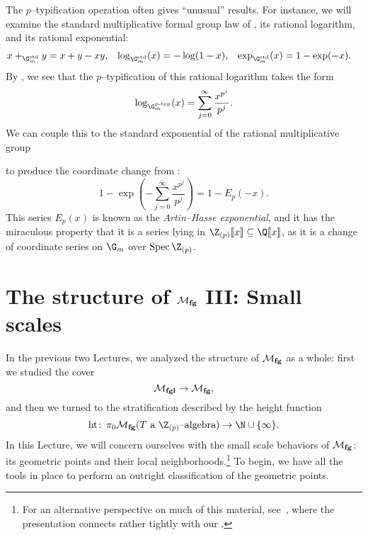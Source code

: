 \begin{remark}\label{ArtinHasseExponential}
The $p$--typification operation often gives ``unusual'' results.  For instance, we will examine the standard multiplicative formal group law of , its rational logarithm, and its rational exponential:
\begin{align*}
x +_{\G_m^{\mathrm{std}}} y & = x + y - xy, &
\log_{\G_m^{\mathrm{std}}}(x) & = -\log(1 - x), &
\exp_{\G_m^{\mathrm{std}}}(x) & = 1 - \exp(-x).
\end{align*}
By , we see that the $p$--typification of this rational logarithm takes the form \[\log_{\G_m^{\ptyp}}(x) = \sum_{j=0}^\infty \frac{x^{p^j}}{p^j}.\]  We can couple this to the standard exponential of the rational multiplicative group
\begin{center}
\end{center}
to produce the coordinate change from : \[1 - \exp \left( -\sum_{j=0}^\infty \frac{x^{p^j}}{p^j} \right) = 1 - E_p(-x).\]  This series $E_p(x)$ is known as the \textit{Artin--Hasse exponential}, and it has the miraculous property that it is a series lying in $\Z_{(p)}\ps{x} \subseteq \Q\ps{x}$, as it is a change of coordinate series on $\G_m$ over $\Spec \Z_{(p)}$.
\end{remark}






\section{The structure of \texorpdfstring{$\mathcal{M}_{\mathbf{fg}}$}{Mfg} III: Small scales}\label{SectionMfgSmallScales}

In the previous two Lectures, we analyzed the structure of $\mathcal{M}_{\mathbf{fg}}$ as a whole: first we studied the cover \[\mathcal{M}_{\mathbf{fgl}} \to \mathcal{M}_{\mathbf{fg}},\] and then we turned to the stratification described by the height function \[\height\co \pi_0 \moduli{fg}(\text{$T$ a $\Z_{(p)}$--algebra}) \to \N \cup \{\infty\}.\]  In this Lecture, we will concern ourselves with the small scale behaviors of $\mathcal{M}_{\mathbf{fg}}$: its geometric points and their local neighborhoods.\footnote{For an alternative perspective on much of this material, see~\cite[Section 18]{StricklandFGNotes}, where the presentation connects rather tightly with our .}  To begin, we have all the tools in place to perform an outright classification of the geometric points.

